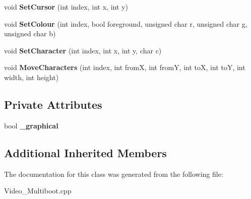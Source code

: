 \begin{DoxyCompactItemize}
void {\bfseries Set\+Cursor} (int index, int x, int y)
\item 
\mbox{\label{class_multiboot_video_a082cd66f51e00a4ad45e91fb7b842266}} 
void {\bfseries Set\+Colour} (int index, bool foreground, unsigned char r, unsigned char g, unsigned char b)
\item 
\mbox{\label{class_multiboot_video_a718e738d80a324a6fb0334f2c577cabb}} 
void {\bfseries Set\+Character} (int index, int x, int y, char c)
\item 
\mbox{\label{class_multiboot_video_acc3b93600fd492d821fba737f0600f53}} 
void {\bfseries Move\+Characters} (int index, int fromX, int fromY, int toX, int toY, int width, int height)
\end{DoxyCompactItemize}
\subsection*{Private Attributes}
\begin{DoxyCompactItemize}
\item 
\mbox{\label{class_multiboot_video_a262bfb74406068c9a6a3d641472d3ebc}} 
bool {\bfseries \+\_\+graphical}
\end{DoxyCompactItemize}
\subsection*{Additional Inherited Members}


The documentation for this class was generated from the following file\+:\begin{DoxyCompactItemize}
\item 
Video\+\_\+\+Multiboot.\+cpp\end{DoxyCompactItemize}

